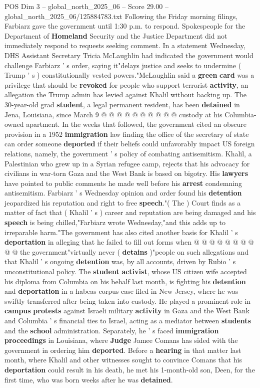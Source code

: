 \begin{textsample}{POS Dim 3 – global\_north\_2025\_06 – Score 29.00 – global\_north\_2025\_06/125884783.txt}
Following the Friday morning filings, Farbiarz gave the government until 1:30 p.m. to respond.
Spokespeople for the Department of \textbf{Homeland} Security and the Justice Department did not immediately respond to requests seeking comment.
In a statement Wednesday, DHS Assistant Secretary Tricia McLaughlin had indicated the government would challenge Farbiarz ' s order, saying it"delays justice and seeks to undermine ( Trump ' s ) constitutionally vested powers."McLaughlin said a \textbf{green} \textbf{card} was a privilege that should be \textbf{revoked} for people who support terrorist \textbf{activity}, an allegation the Trump admin has levied against Khalil without backing up.
The 30-year-old grad \textbf{student}, a legal permanent resident, has been \textbf{detained} in Jena, Louisiana, since March 9 @ @ @ @ @ @ @ @ @ @ custody at his Columbia-owned apartment.
In the weeks that followed, the government cited an obscure provision in a 1952 \textbf{immigration} law finding the office of the secretary of state can order someone \textbf{deported} if their beliefs could unfavorably impact US foreign relations, namely, the government ' s policy of combating antisemitism.
Khalil, a Palestinian who grew up in a Syrian refugee camp, rejects that his advocacy for civilians in war-torn Gaza and the West Bank is based on bigotry.
His \textbf{lawyers} have pointed to public comments he made well before his \textbf{arrest} condemning antisemitism.
Farbiarz ' s Wednesday opinion and order found his \textbf{detention} jeopardized his reputation and right to free \textbf{speech}."( The ) Court finds as a matter of fact that ( Khalil ' s ) career and reputation are being damaged and his \textbf{speech} is being chilled,"Farbiarz wrote Wednesday,"and this adds up to irreparable harm."The government has also cited another basis for Khalil ' s \textbf{deportation} in alleging that he failed to fill out forms when @ @ @ @ @ @ @ @ @ @ the government"virtually never ( \textbf{detains} )"people on such allegations and that Khalil ' s ongoing \textbf{detention} was, by all accounts, driven by Rubio ' s unconstitutional policy.
The \textbf{student} \textbf{activist}, whose US citizen wife accepted his diploma from Columbia on his behalf last month, is fighting his \textbf{detention} and \textbf{deportation} in a habeas corpus case filed in New Jersey, where he was swiftly transferred after being taken into custody.
He played a prominent role in \textbf{campus} \textbf{protests} against Israeli military \textbf{activity} in Gaza and the West Bank and Columbia ' s financial ties to Israel, acting as a mediator between \textbf{students} and the \textbf{school} administration.
Separately, he ' s faced \textbf{immigration} \textbf{proceedings} in Louisiana, where \textbf{Judge} Jamee Comans has sided with the government in ordering him \textbf{deported}.
Before a \textbf{hearing} in that matter last month, where Khalil and other witnesses sought to convince Comans that his \textbf{deportation} could result in his death, he met his 1-month-old son, Deen, for the first time, who was born weeks after he was \textbf{detained}.


\end{textsample}

